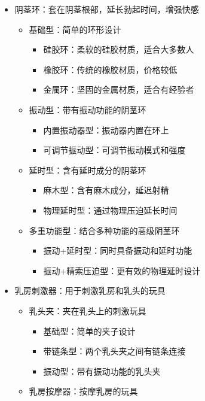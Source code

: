 \documentclass[12pt,UTF8]{ctexbook}
\begin{document}
\begin{itemize}
\begin{itemize}
\begin{itemize}
\begin{itemize}
				\item 可冷却型：冷却至较低温度
				\item 冷热交替型：可快速切换温度
			\end{itemize}
		\end{itemize}
		\item 阴茎环：套在阴茎根部，延长勃起时间，增强快感
		\begin{itemize}
			\item 基础型：简单的环形设计
			\begin{itemize}
				\item 硅胶环：柔软的硅胶材质，适合大多数人
				\item 橡胶环：传统的橡胶材质，价格较低
				\item 金属环：坚固的金属材质，适合有经验者
			\end{itemize}
			\item 振动型：带有振动功能的阴茎环
			\begin{itemize}
				\item 内置振动器型：振动器内置在环上
				\item 可调节振动型：可调节振动模式和强度
			\end{itemize}
			\item 延时型：含有延时成分的阴茎环
			\begin{itemize}
				\item 麻木型：含有麻木成分，延迟射精
				\item 物理延时型：通过物理压迫延长时间
			\end{itemize}
			\item 多重功能型：结合多种功能的高级阴茎环
			\begin{itemize}
				\item 振动+延时型：同时具备振动和延时功能
				\item 振动+精索压迫型：更有效的物理延时设计
			\end{itemize}
		\end{itemize}
		\item 乳房刺激器：用于刺激乳房和乳头的玩具
		\begin{itemize}
			\item 乳头夹：夹在乳头上的刺激玩具
			\begin{itemize}
				\item 基础型：简单的夹子设计
				\item 带链条型：两个乳头夹之间有链条连接
				\item 振动型：带有振动功能的乳头夹
			\end{itemize}
			\item 乳房按摩器：按摩乳房的玩具

\end{itemize}
\end{itemize}
\end{itemize}
\end{document}
